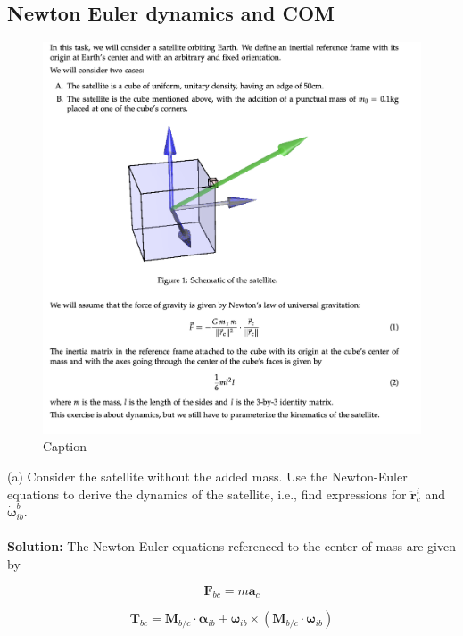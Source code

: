 \subsection{Newton Euler dynamics and COM}

\begin{figure}[H]
    \centering
    \includegraphics[scale = 0.5]{Skjermbilde 2024-05-23 kl. 18.56.18.png}
    \caption{Caption}
    \label{fig:enter-label}
\end{figure}

(a) Consider the satellite without the added mass. Use the Newton-Euler equations to derive the dynamics of the satellite, i.e., find expressions for $\ddot{\mathbf{r}}_c^i$ and $\dot{\boldsymbol{\omega}}_{ib}^b$.
\\
\\

\textbf{Solution:} The Newton-Euler equations referenced to the center of mass are given by

\begin{equation}
    \mathbf{F}_{bc} = m \mathbf{a}_c
\end{equation}

\begin{equation}
    \mathbf{T}_{bc} = \mathbf{M}_{b/c} \cdot \boldsymbol{\alpha}_{ib} + \boldsymbol{\omega}_{ib} \times \left( \mathbf{M}_{b/c} \cdot \boldsymbol{\omega}_{ib} \right)
\end{equation}

